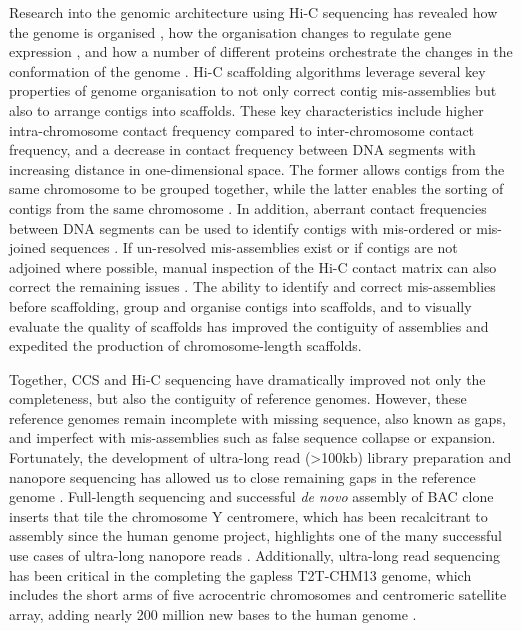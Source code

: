 Research into the genomic architecture using Hi-C sequencing has revealed how the genome is organised \cite{}, how the organisation changes to regulate gene expression \cite{}, and how a number of different proteins orchestrate the changes in the conformation of the genome \cite{}. Hi-C scaffolding algorithms leverage several key properties of genome organisation to not only correct contig mis-assemblies but also to arrange contigs into scaffolds. These key characteristics include higher intra-chromosome contact frequency compared to inter-chromosome contact frequency, and a decrease in contact frequency between DNA segments with increasing distance in one-dimensional space. The former allows contigs from the same chromosome to be grouped together, while the latter enables the sorting of contigs from the same chromosome \cite{}. In addition, aberrant contact frequencies between DNA segments can be used to identify contigs with mis-ordered or mis-joined sequences \cite{}. If un-resolved mis-assemblies exist or if contigs are not adjoined where possible, manual inspection of the Hi-C contact matrix can also correct the remaining issues \cite{}. The ability to identify and correct mis-assemblies before scaffolding, group and organise contigs into scaffolds, and to visually evaluate the quality of scaffolds has improved the contiguity of assemblies and expedited the production of chromosome-length scaffolds. 

Together, CCS and Hi-C sequencing have dramatically improved not only the completeness, but also the contiguity of reference genomes. However, these reference genomes remain incomplete with missing sequence, also known as gaps, and imperfect with mis-assemblies such as false sequence collapse or expansion. Fortunately, the development of ultra-long read (>100kb) library preparation and nanopore sequencing has allowed us to close remaining gaps in the reference genome \cite{}. Full-length sequencing and successful \textit{de novo} assembly of BAC clone inserts that tile the chromosome Y centromere, which has been recalcitrant to assembly since the human genome project, highlights one of the many successful use cases of ultra-long nanopore reads \cite{}. Additionally, ultra-long read sequencing has been critical in the completing the gapless T2T-CHM13 genome, which includes the short arms of five acrocentric chromosomes and centromeric satellite array, adding nearly 200 million new bases to the human genome \cite{}.

